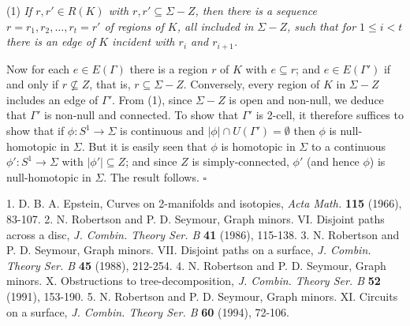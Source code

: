 \hspace*{12pt}(1) \textit{If $r, r' \in R(K)$ with $r, r' \subseteq \Sigma - Z$, then there is a sequence $r = r_1, r_2, \dots, r_t = r'$ of regions of $K$, all included in $\Sigma - Z$, such that for $1 \le i < t$ there is an edge of $K$ incident with $r_i$ and $r_{i+1}$.}

Now for each $e \in E(\Gamma)$ there is a region $r$ of $K$ with $e \subseteq r$; and $e \in E(\Gamma')$ if and only if $r \not\subseteq Z$, that is, $r \subseteq \Sigma - Z$. Conversely, every region of $K$ in $\Sigma - Z$ includes an edge of $\Gamma'$. From (1), since $\Sigma - Z$ is open and non-null, we deduce that $\Gamma'$ is non-null and connected. To show that $\Gamma'$ is 2-cell, it therefore suffices to show that if $\phi \colon S^1 \to \Sigma$ is continuous and $|\phi| \cap U(\Gamma') = \emptyset$ then $\phi$ is null-homotopic in $\Sigma$. But it is easily seen that $\phi$ is homotopic in $\Sigma$ to a continuous $\phi' \colon S^1 \to \Sigma$ with $|\phi'| \subseteq Z$; and since $Z$ is simply-connected, $\phi'$ (and hence $\phi$) is null-homotopic in $\Sigma$. The result follows. $\square$


1. D. B. A. Epstein, Curves on 2-manifolds and isotopies, \textit{Acta Math.} \textbf{115} (1966), 83-107. 2. N. Robertson and P. D. Seymour, Graph minors. VI. Disjoint paths across a disc, \textit{J. Combin. Theory Ser. B} \textbf{41} (1986), 115-138. 3. N. Robertson and P. D. Seymour, Graph minors. VII. Disjoint paths on a surface, \textit{J. Combin. Theory Ser. B} \textbf{45} (1988), 212-254. 4. N. Robertson and P. D. Seymour, Graph minors. X. Obstructions to tree-decomposition, \textit{J. Combin. Theory Ser. B} \textbf{52} (1991), 153-190. 5. N. Robertson and P. D. Seymour, Graph minors. XI. Circuits on a surface, \textit{J. Combin. Theory Ser. B} \textbf{60} (1994), 72-106.
